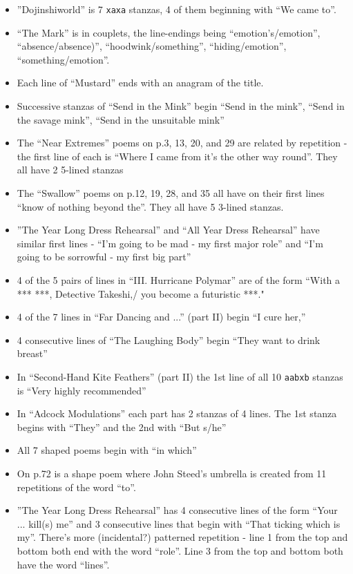 \documentclass[11pt]{article}
\begin{document}
\begin{itemize}
\item ''Dojinshiworld'' is 7 \texttt{xaxa} stanzas, 4 of them beginning with ``We came to''.
\item ``The Mark'' is in couplets, the line-endings being ``emotion's/emotion'', ``absence/absence)'', ``hoodwink/something'', ``hiding/emotion'', ``something/emotion''.
\item Each line of ``Mustard'' ends with an anagram of the title.
\item Successive stanzas of ``Send in the Mink'' begin ``Send in the mink'', ``Send in the savage mink'', ``Send in the unsuitable mink'' 
\item The ``Near Extremes'' poems on p.3, 13, 20, and 29 are related by repetition - the first line of each is ``Where I came from it's the other way round''. They all have 2 5-lined stanzas
\item The ``Swallow'' poems on p.12, 19, 28, and 35 all have on their first lines ``know of nothing beyond the''. They all have 5 3-lined stanzas.
\item ''The Year Long Dress Rehearsal'' and ``All Year Dress Rehearsal'' have similar first lines - ``I'm going to be mad - my first major role'' and ``I'm going to be sorrowful - my first big part''
\item 4 of the 5 pairs of lines in ``III. Hurricane Polymar'' are of the form ``With a *** ***, Detective Takeshi,/ you become a futuristic ***."
\item 4 of the 7 lines in ``Far Dancing and ...'' (part II) begin ``I cure her,''
\item 4 consecutive lines of ``The Laughing Body'' begin ``They want to drink breast''
\item In ``Second-Hand Kite Feathers'' (part II) the 1st line of all 10 \texttt{aabxb} stanzas is ``Very highly recommended''
\item In ``Adcock Modulations'' each part has 2 stanzas of 4 lines. The 1st stanza begins with ``They'' and the 2nd with ``But s/he''
\item All 7 shaped poems begin with ``in which''
\item On p.72 is a shape poem where John Steed's umbrella is created from 11 repetitions of the word ``to''.
\item ''The Year Long Dress Rehearsal'' has 4 consecutive lines of the form ``Your ... kill(s) me'' and 3 consecutive lines that begin with ``That ticking which is my''. There's more (incidental?) patterned repetition - line 1 from the top and bottom both end with the word ``role''. Line 3 from the top and bottom both have the word ``lines''.
\end{itemize}
\end{document}
